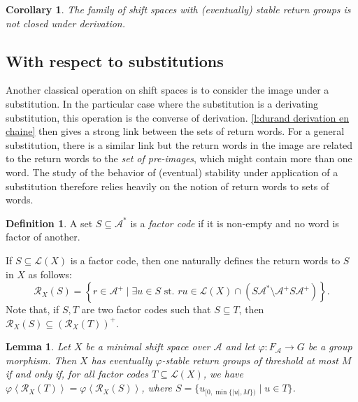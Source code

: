 \documentclass{amsart}
\newcommand*{\ret}{\mathcal{R}}
\newcommand*{\lang}{\mathcal{L}}
\newcommand*{\cA}{\mathcal{A}}
\newcommand*{\from}{\colon}
\newcommand*{\gen}[1]{\left\langle #1\right\rangle}
\theoremstyle{plain}
\newtheorem{lemma}[theorem]{Lemma}
\newtheorem{corollary}[theorem]{Corollary}
\theoremstyle{definition}
\newtheorem{definition}[theorem]{Definition}
\theoremstyle{remark}
\begin{document}
\begin{corollary}
    The family of shift spaces with (eventually) stable return groups is not closed under derivation.
\end{corollary}

\subsection{With respect to substitutions}

Another classical operation on shift spaces is to consider the image under a substitution. In the particular case where the substitution is a derivating substitution, this operation is the converse of derivation. \cref{l:durand derivation en chaine} then gives a strong link between the sets of return words. For a general substitution, there is a similar link but the return words in the image are related to the return words to the \emph{set of pre-images}, which might contain more than one word. The study of the behavior of (eventual) stability under application of a substitution therefore relies heavily on the notion of return words to sets of words.

\begin{definition}
    A set $S \subseteq \cA^*$ is a \emph{factor code} if it is non-empty and no word is factor of another.
\end{definition}
If $S \subseteq \lang(X)$ is a factor code, then one naturally defines the return words to $S$ in $X$ as follows:
\[
    \ret_X(S) = \left\{r \in \cA^+ \mid \exists u \in S \text{ st. } ru \in \lang(X) \cap (S\cA^* \setminus \cA^+S\cA^+)\right\}.
\]
Note that, if $S, T$ are two factor codes such that $S \subseteq T$, then $\ret_X(S) \subseteq (\ret_X(T))^+$.

\begin{lemma}\label{L:stable return groups also works for sets}
    Let $X$ be a minimal shift space over $\cA$ and let $\varphi\from F_\cA \to G$ be a group morphism. Then $X$ has eventually $\varphi$-stable return groups of threshold at most $M$ if and only if, for all factor codes $T \subseteq \lang(X)$, we have $\varphi\gen{\ret_X(T)} = \varphi\gen{\ret_X(S)}$, where $S = \{u_{[0,\min\{|u|,M\})} \mid u \in T\}$.
\end{lemma}
\end{document}
